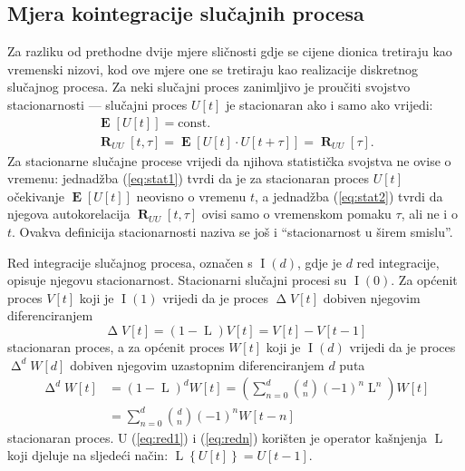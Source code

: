 \documentclass[lmodern, utf8, diplomski, numeric]{fer}
\newcommand{\E}[1]{\operatorname{\mathbf{E}}\q[#1\w]}
\newcommand{\R}[2]{\operatorname{\mathbf{R}}_{#1}\q[#2\w]}
\newcommand{\I}[1]{\operatorname{\mathrm{I}}\q(#1\w)}
\newcommand{\diff}{\operatorname{\mathrm{\Delta}}}
\newcommand{\diffn}[1]{\operatorname{\mathrm{\Delta}}^d}
\newcommand{\lag}{\operatorname{\mathrm{L}}}
\newcommand{\q}{\left}
\newcommand{\w}{\right}
\begin{document}
  \subsection{Mjera kointegracije slučajnih procesa}
  Za razliku od prethodne dvije mjere sličnosti gdje se cijene dionica tretiraju kao vremenski nizovi, kod ove mjere one se tretiraju kao realizacije diskretnog slučajnog procesa.
  Za neki slučajni proces zanimljivo je proučiti svojstvo stacionarnosti --- slučajni proces $U\q[t\w]$ je stacionaran ako i samo ako vrijedi:
  \begin{gather}
  \label{eq:stat1}
  \E{U\q[t\w]} = \mathrm{const.}\\
  \label{eq:stat2}
  \R{UU}{t, \tau} = \E{U\q[t\w] \cdot U\q[t + \tau\w]} = \R{UU}{\tau}.
  \end{gather}
  Za stacionarne slučajne procese vrijedi da njihova statistička svojstva ne ovise o vremenu:
  jednadžba (\ref{eq:stat1}) tvrdi da je za stacionaran proces $U\q[t\w]$ očekivanje $\E{U\q[t\w]}$ neovisno o vremenu $t$, a jednadžba (\ref{eq:stat2}) tvrdi da njegova autokorelacija $\R{UU}{t, \tau}$ ovisi samo o vremenskom pomaku $\tau$, ali ne i o $t$.
  Ovakva definicija stacionarnosti naziva se još i ``stacionarnost u širem smislu''.
  
  Red integracije slučajnog procesa, označen s $\I{d}$, gdje je $d$ red integracije, opisuje njegovu stacionarnost.
  Stacionarni slučajni procesi su $\I{0}$.
  Za općenit proces $V\q[t\w]$ koji je $\I{1}$ vrijedi da je proces $\diff V\q[t\w]$ dobiven njegovim diferenciranjem
  \begin{equation}
  \label{eq:red1}
  \diff V\q[t\w] = \q(1 - \lag\w) V\q[t\w] = V\q[t\w] - V\q[t - 1\w]
  \end{equation}
  stacionaran proces, a za općenit proces $W\q[t\w]$ koji je $\I{d}$ vrijedi da je proces $\diffn{d} W\q[d\w]$ dobiven njegovim uzastopnim diferenciranjem $d$ puta
  \begin{align}
  \diffn{d} W\q[t\w] &= \q(1 - \lag\w)^d W\q[t\w] = \q( \sum_{n = 0}^{d} \binom{d}{n} \q(-1\w)^n\lag^n \w) W\q[t\w] \nonumber \\
  \label{eq:redn}
  &= \sum_{n = 0}^{d} \binom{d}{n} \q(-1\w)^n W\q[t - n\w]
  \end{align}
  stacionaran proces.
  U (\ref{eq:red1}) i (\ref{eq:redn}) korišten je operator kašnjenja $\lag$ koji djeluje na sljedeći način: $\lag \q\{U\q[t\w]\w\} = U\q[t - 1\w]$.
  
\end{document}

